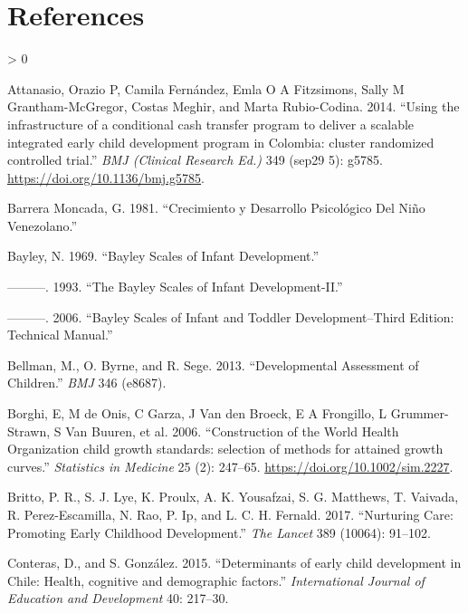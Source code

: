\documentclass[
]{book}
\newlength{\cslhangindent}
\newenvironment{CSLReferences}[2] %
 {%
  \setlength{\parindent}{0pt}
  \ifodd #1 \everypar{\setlength{\hangindent}{\cslhangindent}}\ignorespaces\fi
  \ifnum #2 > 0
  \setlength{\parskip}{#2\baselineskip}
  \fi
 }%
 {}
\begin{document}
\hypertarget{references}{%
\chapter*{References}\label{references}}

\hypertarget{refs}{}
\begin{CSLReferences}{1}{0}
\leavevmode\hypertarget{ref-Attanasio2014}{}%
Attanasio, Orazio P, Camila Fernández, Emla O A Fitzsimons, Sally M Grantham-McGregor, Costas Meghir, and Marta Rubio-Codina. 2014. {``{Using the infrastructure of a conditional cash transfer program to deliver a scalable integrated early child development program in Colombia: cluster randomized controlled trial.}''} \emph{BMJ (Clinical Research Ed.)} 349 (sep29 5): g5785. \url{https://doi.org/10.1136/bmj.g5785}.

\leavevmode\hypertarget{ref-barrera1981}{}%
Barrera Moncada, G. 1981. {``Crecimiento y Desarrollo Psicológico Del Niño Venezolano.''}

\leavevmode\hypertarget{ref-bayley1969}{}%
Bayley, N. 1969. {``Bayley Scales of Infant Development.''}

\leavevmode\hypertarget{ref-bayley1993}{}%
---------. 1993. {``The Bayley Scales of Infant Development-II.''}

\leavevmode\hypertarget{ref-bayley2006}{}%
---------. 2006. {``Bayley Scales of Infant and Toddler Development--Third Edition: Technical Manual.''}

\leavevmode\hypertarget{ref-bellman2013}{}%
Bellman, M., O. Byrne, and R. Sege. 2013. {``Developmental Assessment of Children.''} \emph{BMJ} 346 (e8687).

\leavevmode\hypertarget{ref-borghi2006}{}%
Borghi, E, M de Onis, C Garza, J Van den Broeck, E A Frongillo, L Grummer-Strawn, S Van Buuren, et al. 2006. {``{Construction of the World Health Organization child growth standards: selection of methods for attained growth curves.}''} \emph{Statistics in Medicine} 25 (2): 247--65. \url{https://doi.org/10.1002/sim.2227}.

\leavevmode\hypertarget{ref-britto2017}{}%
Britto, P. R., S. J. Lye, K. Proulx, A. K. Yousafzai, S. G. Matthews, T. Vaivada, R. Perez-Escamilla, N. Rao, P. Ip, and L. C. H. Fernald. 2017. {``Nurturing Care: Promoting Early Childhood Development.''} \emph{The Lancet} 389 (10064): 91--102.

\leavevmode\hypertarget{ref-conteras2015}{}%
Conteras, D., and S. González. 2015. {``{Determinants of early child development in Chile: Health, cognitive and demographic factors.}''} \emph{International Journal of Education and Development} 40: 217--30.


\end{CSLReferences}
\end{document}
